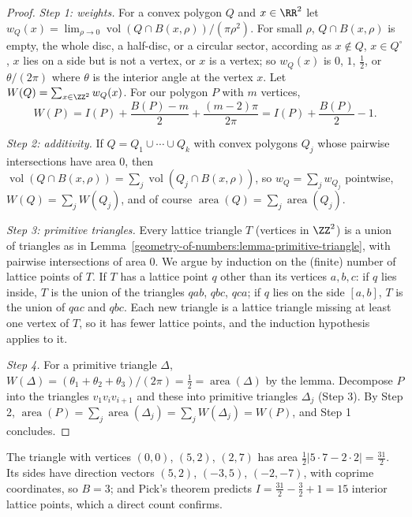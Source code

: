 \begin{proof}
\emph{Step 1: weights.} For a convex polygon $Q$ and $x \in \RR^2$ let $w_Q(x) = \lim_{\rho \to 0}\operatorname{vol}(Q \cap B(x, \rho))/(\pi\rho^2)$. For small $\rho$, $Q \cap B(x, \rho)$ is empty, the
whole disc, a half-disc, or a circular sector, according as $x \notin Q$, $x \in Q^\circ$, $x$ lies on a side but is not a vertex, or $x$ is a vertex; so $w_Q(x)$ is $0$, $1$, $\frac12$, or
$\theta/(2\pi)$ where $\theta$ is the interior angle at the vertex $x$. Let $W(Q) = \sum_{x \in \ZZ^2}w_Q(x)$. For our polygon $P$ with $m$ vertices,
\[
W(P) = I(P) + \frac{B(P) - m}{2} + \frac{(m - 2)\pi}{2\pi} = I(P) + \frac{B(P)}{2} - 1.
\]

\emph{Step 2: additivity.} If $Q = Q_1 \cup \cdots \cup Q_k$ with convex polygons $Q_j$ whose pairwise intersections have area $0$, then $\operatorname{vol}(Q \cap B(x, \rho)) = \sum_j\operatorname{vol}(Q_j \cap B(x, \rho))$,
so $w_Q = \sum_jw_{Q_j}$ pointwise, $W(Q) = \sum_jW(Q_j)$, and of course $\operatorname{area}(Q) = \sum_j\operatorname{area}(Q_j)$.

\emph{Step 3: primitive triangles.} Every lattice triangle $T$ (vertices in $\ZZ^2$) is a union of triangles as in Lemma~\ref{geometry-of-numbers:lemma-primitive-triangle}, with pairwise intersections of
area $0$. We argue by induction on the (finite) number of lattice points of $T$. If $T$ has a lattice point $q$ other than its vertices $a, b, c$: if $q$ lies inside, $T$ is the union of the triangles
$qab$, $qbc$, $qca$; if $q$ lies on the side $[a, b]$, $T$ is the union of $qac$ and $qbc$. Each new triangle is a lattice triangle missing at least one vertex of $T$, so it has fewer lattice points, and
the induction hypothesis applies to it.

\emph{Step 4.} For a primitive triangle $\Delta$, $W(\Delta) = (\theta_1 + \theta_2 + \theta_3)/(2\pi) = \frac12 = \operatorname{area}(\Delta)$ by the lemma. Decompose $P$ into the triangles $v_1v_iv_{i+1}$ and
these into primitive triangles $\Delta_j$ (Step 3). By Step 2, $\operatorname{area}(P) = \sum_j\operatorname{area}(\Delta_j) = \sum_jW(\Delta_j) = W(P)$, and Step 1 concludes.
\end{proof}

\begin{example}\label{geometry-of-numbers:example-pick}
The triangle with vertices $(0, 0)$, $(5, 2)$, $(2, 7)$ has area $\frac12|5 \cdot 7 - 2 \cdot 2| = \frac{31}{2}$. Its sides have direction vectors $(5, 2)$, $(-3, 5)$, $(-2, -7)$, with coprime coordinates,
so $B = 3$; and Pick's theorem predicts $I = \frac{31}{2} - \frac32 + 1 = 15$ interior lattice points, which a direct count confirms.
\end{example}

